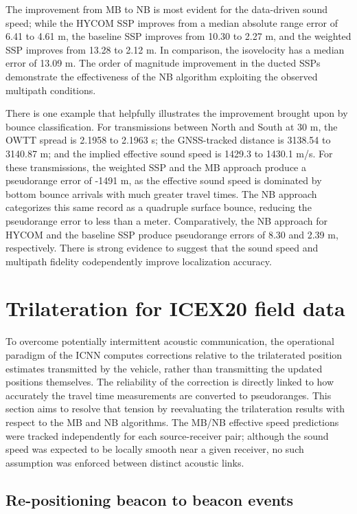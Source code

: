 The improvement from MB to NB is most evident for the data-driven sound speed; while the HYCOM SSP improves from a median absolute range error of 6.41 to 4.61 m, the baseline SSP improves from 10.30 to 2.27 m, and the weighted SSP improves from 13.28 to 2.12 m.
In comparison, the isovelocity has a median error of 13.09 m.
The order of magnitude improvement in the ducted SSPs demonstrate the effectiveness of the NB algorithm exploiting the observed multipath conditions.

 There is one example that helpfully illustrates the improvement brought upon by bounce classification.
For transmissions between North and South at 30 m, the OWTT spread is 2.1958 to 2.1963 s; the GNSS-tracked distance is 3138.54 to 3140.87 m; and the implied effective sound speed is 1429.3 to 1430.1 m/s.
For these transmissions, the weighted SSP and the MB approach produce a pseudorange error of -1491 m, as the effective sound speed is dominated by bottom bounce arrivals with much greater travel times.
The NB approach categorizes this same record as a quadruple surface bounce, reducing the pseudorange error to less than a meter.
Comparatively, the NB approach for HYCOM and the baseline SSP produce pseudorange errors of 8.30 and 2.39 m, respectively. 
There is strong evidence to suggest that the sound speed and multipath fidelity codependently improve localization accuracy.

\clearpage
\section{Trilateration for ICEX20 field data}\label{sec:trilat}

To overcome potentially intermittent acoustic communication, the operational paradigm of the ICNN computes corrections relative to the trilaterated position estimates transmitted by the vehicle, rather than transmitting the updated positions themselves.
The reliability of the correction is directly linked to how accurately the travel time measurements are converted to pseudoranges.
This section aims to resolve that tension by reevaluating the trilateration results with respect to the MB and NB algorithms.
The MB/NB effective speed predictions were tracked independently for each source-receiver pair; although the sound speed was expected to be locally smooth near a given receiver, no such assumption was enforced between distinct acoustic links.

\subsection{Re-positioning beacon to beacon events}

